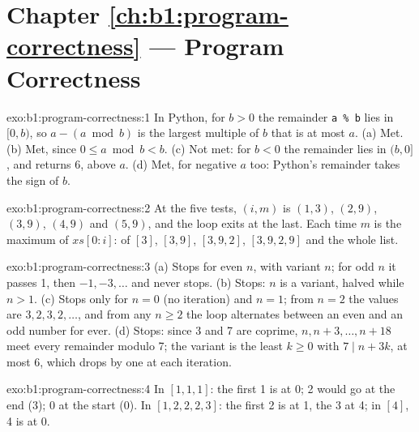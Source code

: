 \section*{Chapter \ref{ch:b1:program-correctness} --- Program Correctness}

\begin{solution}{exo:b1:program-correctness:1}
In Python, for $b > 0$ the remainder \texttt{a \% b} lies in $[0, b)$, so $a - (a \bmod b)$ is the largest multiple of
$b$ that is at most $a$. (a) Met. (b) Met, since $0 \leq a \bmod b < b$. (c) Not met: for $b < 0$ the remainder lies in
$(b, 0]$, and  returns 6, above $a$. (d) Met, for negative $a$ too: Python's remainder takes the sign of
$b$.
\end{solution}

\begin{solution}{exo:b1:program-correctness:2}
At the five tests, $(i, m)$ is $(1, 3)$, $(2, 9)$, $(3, 9)$, $(4, 9)$ and $(5, 9)$, and the loop exits at the last. Each
time $m$ is the maximum of $xs[0{:}i]$: of $[3]$, $[3, 9]$, $[3, 9, 2]$, $[3, 9, 2, 9]$ and the whole list.
\end{solution}

\begin{solution}{exo:b1:program-correctness:3}
(a) Stops for even $n$, with variant $n$; for odd $n$ it passes 1, then $-1, -3, \dots$ and never stops. (b) Stops:
$n$ is a variant, halved while $n > 1$. (c) Stops only for $n = 0$ (no iteration) and $n = 1$; from $n = 2$ the values
are $3, 2, 3, 2, \dots$, and from any $n \geq 2$ the loop alternates between an even and an odd number for ever.
(d) Stops: since 3 and 7 are coprime, $n, n + 3, \dots, n + 18$ meet every remainder modulo 7; the variant is the
least $k \geq 0$ with $7 \mid n + 3k$, at most 6, which drops by one at each iteration.
\end{solution}

\begin{solution}{exo:b1:program-correctness:4}
In $[1, 1, 1]$: the first 1 is at 0; 2 would go at the end (3); 0 at the start (0). In $[1, 2, 2, 2, 3]$: the first 2
is at 1, the 3 at 4; in $[4]$, 4 is at 0.
\end{solution}

